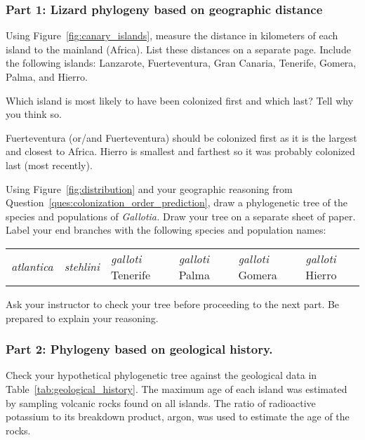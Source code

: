 \documentclass[12pt, hidelinks]{exam}
\newcommand*\AnswerBox[2]{%
    \parbox[t][#1]{0.92\textwidth}{%
    \begin{solution}#2\end{solution}}
    \vspace{\stretch{1}}
}
\begin{document}
\subsubsection*{Part 1: Lizard phylogeny based on geographic distance}

Using Figure~\ref{fig:canary_islands}, measure the distance in kilometers of each island to the mainland (Africa). List these distances on a separate page. Include the following islands: Lanzarote, Fuerteventura, Gran Canaria, Tenerife, Gomera, Palma, and Hierro.

\begin{questions}

\question\label{ques:colonization_order_prediction}
Which island is most likely to have been colonized first and which last? Tell why you think so.

\AnswerBox{3\baselineskip}{%
Fuerteventura (or/and Fuerteventura) should be colonized first as it is the largest and closest to Africa. Hierro is smallest and farthest so it was probably colonized last (most recently).}

\question
Using Figure~\ref{fig:distribution} and your geographic reasoning from Question~\ref{ques:colonization_order_prediction}, draw a phylogenetic tree of the species and populations of \emph{Gallotia.} Draw your tree on a separate sheet of paper. Label your end branches with the following species and population names: 

\begin{tabular}{@{}L{0.8in}L{0.8in}L{0.8in}L{0.8in}L{0.8in}L{0.8in}@{}}
	\textit{atlantica}				&
	\textit{stehlini} 				&
	\textit{galloti} Tenerife	&
	\textit{galloti} Palma 		&
	\textit{galloti} Gomera	&
	\textit{galloti} Hierro		\tabularnewline
\end{tabular}

Ask your instructor to check your tree before proceeding to the next part. Be prepared to explain your reasoning.


\subsubsection*{Part 2: Phylogeny based on geological history.}

Check your hypothetical phylogenetic tree against the geological 
data in Table~\ref{tab:geological_history}. The maximum age of 
each island was estimated by sampling volcanic rocks found on all 
islands. The ratio of radioactive potassium to its breakdown product, 
argon, was used to estimate the age of the rocks.



\end{questions}
\end{document}
